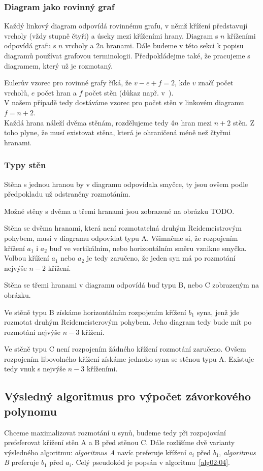 \subsubsection{Diagram jako rovinný graf} \label{jakograf}
Každý linkový diagram odpovídá rovinnému grafu, v němž křížení představují vrcholy (vždy stupně čtyři) a úseky mezi kříženími hrany. Diagram s $n$ kříženími odpovídá grafu s $n$ vrcholy a 2$n$ hranami.
Dále budeme v této sekci k popisu diagramů používat grafovou terminologii. Předpokládejme také, že pracujeme s diagramem, který už je rozmotaný.

Eulerův vzorec pro rovinné grafy říká, že $v - e +f = 2$, kde $v$ značí počet vrcholů, $e$ počet hran a $f$ počet stěn (důkaz např. v~\cite{kapitoly}).
\\
V našem případě tedy dostáváme vzorec pro počet stěn v linkovém diagramu $f = n+2$.
\\
Každá hrana náleží dvěma stěnám, rozdělujeme tedy 4$n$ hran mezi $n+2$ stěn. Z toho plyne, že musí existovat stěna, která je ohraničená méně než čtyřmi hranami.

\subsubsection{Typy stěn}

Stěna s jednou hranou by v diagramu odpovídala smyčce, ty jsou ovšem podle předpokladu už odstraněny rozmotáním.

Možné stěny s dvěma a třemi hranami jsou zobrazené na obrázku TODO.

Stěna se dvěma hranami, která není rozmotatelná druhým Reidemeistrovým pohybem, musí v diagramu odpovídat typu A. Všimněme si, že rozpojením křížení $a_1$ i $a_2$ buď ve vertikálním, nebo horizontálním směru vznikne smyčka. Volbou křížení $a_1$ nebo $a_2$ je tedy zaručeno, že jeden syn má po rozmotání nejvýše $n-2$ křížení.

Stěna se třemi hranami v diagramu odpovídá buď typu B, nebo C zobrazeným na obrázku.

Ve stěně typu B získáme horizontálním rozpojením křížení $b_1$ syna, jenž jde rozmotat druhým Reidemeisterovým pohybem. Jeho diagram tedy bude mít po rozmotání nejvýše $n-3$ křížení.

Ve stěně typu C není rozpojením žádného křížení rozmotání zaručeno. Ovšem rozpojením libovolného křížení získáme jednoho syna se stěnou typu A. Existuje tedy vnuk s nejvýše $n-3$ kříženími.

\subsection{Výsledný algoritmus pro výpočet závorkového polynomu} \label{varianty}
Chceme maximalizovat rozmotání u synů, budeme tedy při rozpojování prefeferovat křížení stěn A a B před stěnou C. Dále rozlišíme dvě varianty výsledného algoritmu: \emph{algoritmus A} navíc preferuje křížení $a_i$ před $b_1$,  \emph{algoritmus B} preferuje $b_1$ před $a_i$. Celý pseudokód je popsán v algoritmu~\ref{alg02:04}.

